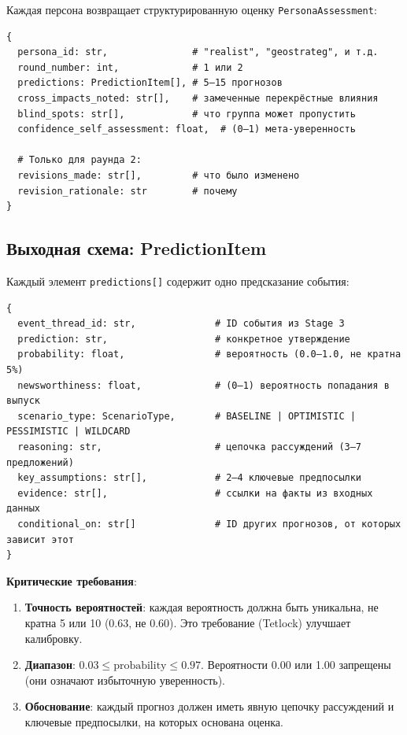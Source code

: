 Каждая персона возвращает структурированную оценку \texttt{PersonaAssessment}:

\begin{definition}
\begin{verbatim}
{
  persona_id: str,               # "realist", "geostrateg", и т.д.
  round_number: int,             # 1 или 2
  predictions: PredictionItem[], # 5–15 прогнозов
  cross_impacts_noted: str[],    # замеченные перекрёстные влияния
  blind_spots: str[],            # что группа может пропустить
  confidence_self_assessment: float,  # (0–1) мета-уверенность

  # Только для раунда 2:
  revisions_made: str[],         # что было изменено
  revision_rationale: str        # почему
}
\end{verbatim}
\end{definition}

\subsection{Выходная схема: PredictionItem}

Каждый элемент \texttt{predictions[]} содержит одно предсказание события:

\begin{definition}
\begin{verbatim}
{
  event_thread_id: str,              # ID события из Stage 3
  prediction: str,                   # конкретное утверждение
  probability: float,                # вероятность (0.0–1.0, не кратна 5%)
  newsworthiness: float,             # (0–1) вероятность попадания в выпуск
  scenario_type: ScenarioType,       # BASELINE | OPTIMISTIC | PESSIMISTIC | WILDCARD
  reasoning: str,                    # цепочка рассуждений (3–7 предложений)
  key_assumptions: str[],            # 2–4 ключевые предпосылки
  evidence: str[],                   # ссылки на факты из входных данных
  conditional_on: str[]              # ID других прогнозов, от которых зависит этот
}
\end{verbatim}
\end{definition}

\textbf{Критические требования}:
\begin{enumerate}
    \item \textbf{Точность вероятностей}: каждая вероятность должна быть уникальна, не кратна 5 или 10 (0.63, не 0.60). Это требование (Tetlock) улучшает калибровку.
    \item \textbf{Диапазон}: $0.03 \leq \text{probability} \leq 0.97$. Вероятности 0.00 или 1.00 запрещены (они означают избыточную уверенность).
    \item \textbf{Обоснование}: каждый прогноз должен иметь явную цепочку рассуждений и ключевые предпосылки, на которых основана оценка.
\end{enumerate}


